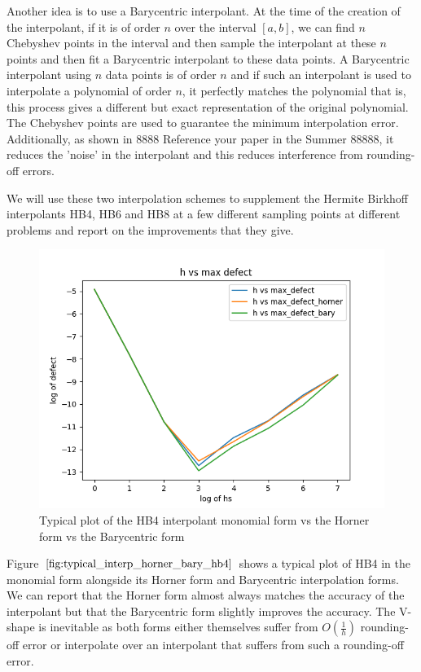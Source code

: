 \documentclass{article}
\begin{document}
Another idea is to use a Barycentric interpolant. At the time of the creation of the interpolant, if it is of order $n$ over the interval $[a, b]$, we can find $n$ Chebyshev points in the interval and then sample the interpolant at these $n$ points and then fit a Barycentric interpolant to these data points. A Barycentric interpolant using $n$ data points is of order $n$ and if such an interpolant is used to interpolate a polynomial of order $n$, it perfectly matches the polynomial that is, this process gives a different but exact representation of the original polynomial. The Chebyshev points are used to guarantee the minimum interpolation error. Additionally, as shown in 8888 Reference your paper in the Summer 88888, it reduces the 'noise' in the interpolant and this reduces interference from rounding-off errors.

We will use these two interpolation schemes to supplement the Hermite Birkhoff interpolants HB4, HB6 and HB8 at a few different sampling points at different problems and report on the improvements that they give.

\begin{figure}[H]
\centering
\includegraphics[width=0.7\linewidth]{./figures/typical_interp_horner_bary_hb4}
\caption{Typical plot of the HB4 interpolant monomial form vs the Horner form vs the Barycentric form}
\label{fig:typical_interp_horner_bary_hb4}
\end{figure}

Figure $\ref{fig:typical_interp_horner_bary_hb4}$ shows a typical plot of HB4 in the monomial form alongside its Horner form and Barycentric interpolation forms. We can report that the Horner form almost always matches the accuracy of the interpolant but that the Barycentric form slightly improves the accuracy. The V-shape is inevitable as both forms either themselves suffer from $O(\frac{1}{h})$ rounding-off error or interpolate over an interpolant that suffers from such a rounding-off error.
\end{document}
